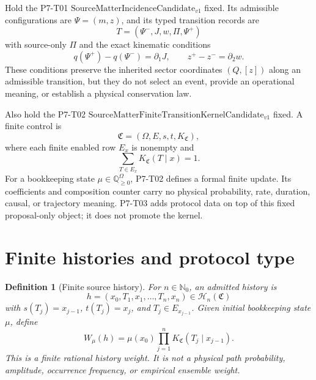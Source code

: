 \documentclass[11pt]{article}
\newtheorem{definition}{Definition}
\newcommand{\Control}{\mathfrak C}
\newcommand{\Hist}{\mathcal H}
\begin{document}
Hold the P7-T01
\(\mathrm{SourceMatterIncidenceCandidate}_{v1}\) fixed. Its admissible
configurations are \(\Psi=(m,z)\), and its typed transition records are
\[
  T=(\Psi^-,J,w,\Pi,\Psi^+)
\]
with source-only \(\Pi\) and the exact kinematic conditions
\[
  q(\Psi^+)-q(\Psi^-)=\partial_1J,\qquad
  z^+-z^-=\partial_2w.
\]
These conditions preserve the inherited sector coordinates
\((Q,[z])\) along an admissible transition, but they do not select an event,
provide an operational meaning, or establish a physical conservation law.

Also hold the P7-T02
\(\mathrm{SourceMatterFiniteTransitionKernelCandidate}_{v1}\) fixed. A
finite control is
\[
  \Control=(\Omega,E,s,t,K_{\Control}),
\]
where each finite enabled row \(E_x\) is nonempty and
\[
  \sum_{T\in E_x}K_{\Control}(T\mid x)=1.
\]
For a bookkeeping state
\(\mu\in\mathbb Q_{\geq0}^{\Omega}\), P7-T02 defines a formal finite update.
Its coefficients and composition counter carry no physical probability,
rate, duration, causal, or trajectory meaning. P7-T03 adds protocol data on
top of this fixed proposal-only object; it does not promote the kernel.

\section{Finite histories and protocol type}

\begin{definition}[Finite source history]
For \(n\in\mathbb N_0\), an admitted history is
\[
  h=(x_0,T_1,x_1,\ldots,T_n,x_n)\in\Hist_n(\Control)
\]
with \(s(T_j)=x_{j-1}\), \(t(T_j)=x_j\), and \(T_j\in E_{x_{j-1}}\).
Given initial bookkeeping state \(\mu\), define
\begin{equation}
  W_{\mu}(h)=
  \mu(x_0)\prod_{j=1}^{n}K_{\Control}(T_j\mid x_{j-1}).
  \label{eq:history-weight}
\end{equation}
This is a finite rational history weight. It is not a physical path
probability, amplitude, occurrence frequency, or empirical ensemble weight.
\end{definition}
\end{document}
